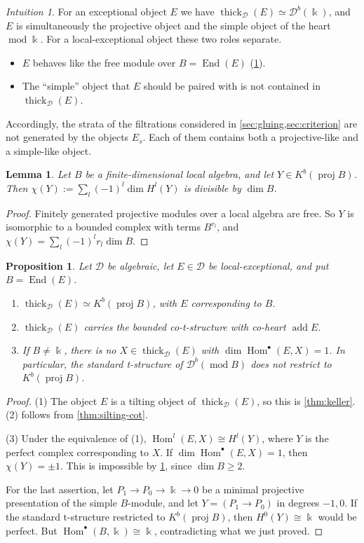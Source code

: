 \documentclass[11pt,reqno]{amsart}
\theoremstyle{plain}
\newtheorem{proposition}[theorem]{Proposition}
\newtheorem{lemma}[theorem]{Lemma}
\theoremstyle{definition}
\theoremstyle{remark}
\newtheorem*{intuition}{Intuition}
\newcommand{\kk}{\Bbbk}
\DeclareMathOperator{\Hom}{Hom}
\DeclareMathOperator{\End}{End}
\DeclareMathOperator{\add}{add}
\newcommand{\modd}{\operatorname{mod}}
\newcommand{\proj}{\operatorname{proj}}
\newcommand{\Db}{\mathcal{D}^b}
\newcommand{\Kb}{K^b}
\newcommand{\thick}[2][\cD]{\operatorname{thick}_{#1}(#2)}
\newcommand{\cD}{\mathcal{D}}
\begin{document}
\begin{intuition}
For an exceptional object $E$ we have $\thick E\simeq\Db(\kk)$, and $E$ is simultaneously the projective object and the simple object of the heart $\modd\kk$. For a local-exceptional object these two roles separate.
\begin{itemize}
\item $E$ behaves like the free module over $B=\End(E)$ (\cref{prop:local-exc}).
\item The ``simple'' object that $E$ should be paired with is not contained in $\thick E$.
\end{itemize}
Accordingly, the strata of the filtrations considered in \cref{sec:gluing,sec:criterion} are not generated by the objects $E_s$. Each of them contains both a projective-like and a simple-like object.
\end{intuition}

\begin{lemma}\label{lem:euler}
Let $B$ be a finite-dimensional local algebra, and let $Y\in\Kb(\proj B)$. Then $\chi(Y):=\sum_l(-1)^l\dim H^l(Y)$ is divisible by $\dim B$.
\end{lemma}

\begin{proof}
Finitely generated projective modules over a local algebra are free. So $Y$ is isomorphic to a bounded complex with terms $B^{r_l}$, and $\chi(Y)=\sum_l(-1)^lr_l\dim B$.
\end{proof}

\begin{proposition}\label{prop:local-exc}
Let $\cD$ be algebraic, let $E\in\cD$ be local-exceptional, and put $B=\End(E)$.
\begin{enumerate}
\item $\thick E\simeq\Kb(\proj B)$, with $E$ corresponding to $B$.
\item $\thick E$ carries the bounded co-t-structure with co-heart $\add E$.
\item If $B\ne\kk$, there is no $X\in\thick E$ with $\dim\Hom^\bullet(E,X)=1$. In particular, the standard t-structure of $\Db(\modd B)$ does not restrict to $\Kb(\proj B)$.
\end{enumerate}
\end{proposition}

\begin{proof}
(1) The object $E$ is a tilting object of $\thick E$, so this is \cref{thm:keller}. (2) follows from \cref{thm:silting-cot}.

(3) Under the equivalence of (1), $\Hom^l(E,X)\cong H^l(Y)$, where $Y$ is the perfect complex corresponding to $X$. If $\dim\Hom^\bullet(E,X)=1$, then $\chi(Y)=\pm1$. This is impossible by \cref{lem:euler}, since $\dim B\ge2$.

For the last assertion, let $P_1\to P_0\to\kk\to0$ be a minimal projective presentation of the simple $B$-module, and let $Y=(P_1\to P_0)$ in degrees $-1,0$. If the standard t-structure restricted to $\Kb(\proj B)$, then $H^0(Y)\cong\kk$ would be perfect. But $\Hom^\bullet(B,\kk)\cong\kk$, contradicting what we just proved.
\end{proof}
\end{document}
